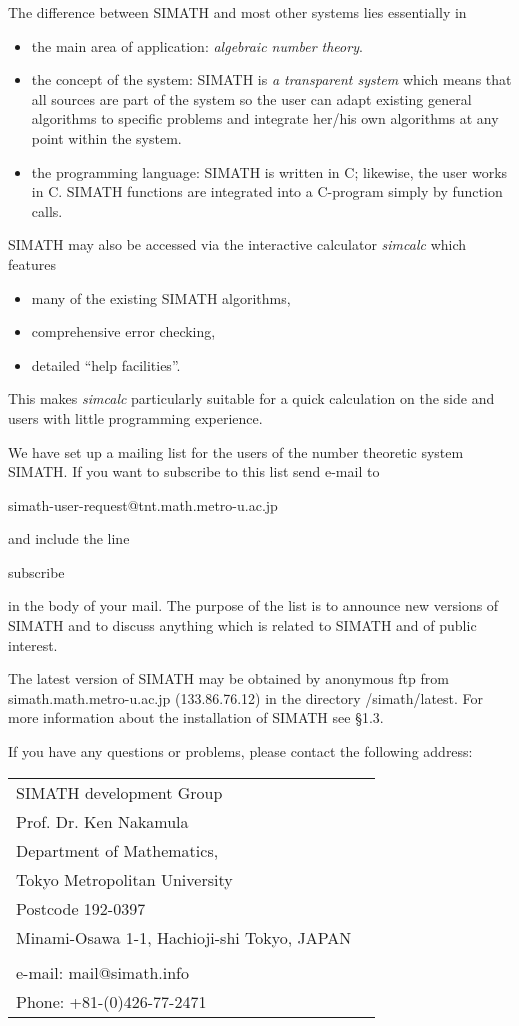 The difference between SIMATH and most other systems lies essentially in 
\begin{itemize}
\item the main area of application: {\em algebraic number theory\/}.
\item the concept of the system: SIMATH is {\em a transparent system\/} which means that all sources are part of the system so the user can adapt existing general algorithms
to specific problems and integrate her/his own algorithms at any point within the system.
\item the programming language: SIMATH is written in C; likewise, the user works in C.
      SIMATH functions are integrated into a C-program simply by function calls.
\end{itemize}
SIMATH may also be accessed via the interactive calculator {\em simcalc\/} which features
\begin{itemize}
\item many of the existing SIMATH algorithms,
\item comprehensive error checking,
\item detailed ``help facilities''. 
\end{itemize}
This makes {\em simcalc\/} particularly suitable for a quick calculation on the side and
users with little programming experience.

  We have set up a mailing list for the users of the number theoretic 
system SIMATH. 
If you want to subscribe to this list send e-mail to
\begin{center}
simath-user-request@tnt.math.metro-u.ac.jp
\end{center}
and include the line 
\begin{center}
subscribe
\end{center}
in the body of your mail. The purpose of the list is to announce new versions 
of SIMATH and to discuss anything which is related to SIMATH and of public 
interest.

  The latest version of SIMATH may be obtained by anonymous ftp from
simath.math.metro-u.ac.jp (133.86.76.12) in the directory /simath/latest. 
For more information about the installation of SIMATH see \S 1.3.

If you have any questions or problems, please contact the following address:
\begin{center}
\begin{tabular}{ll}
SIMATH development Group & \\
Prof. Dr. Ken Nakamula &   \\
Department of Mathematics, & \\
Tokyo Metropolitan University & \\
Postcode 192-0397 & \\
Minami-Osawa 1-1, Hachioji-shi Tokyo, JAPAN & \\
& \\
e-mail: mail@simath.info &\\
Phone: +81-(0)426-77-2471
\end{tabular}
\end{center}  
\newpage


